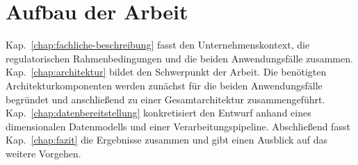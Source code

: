 \section{Aufbau der Arbeit}
\label{sec:aufbau}

Kap.~\ref{chap:fachliche-beschreibung} fasst den Unternehmenskontext, die
regulatorischen Rahmenbedingungen und die beiden Anwendungsfälle zusammen.
Kap.~\ref{chap:architektur} bildet den
Schwerpunkt der Arbeit. Die benötigten Architekturkomponenten werden zunächst
für die beiden Anwendungsfälle begründet und anschließend zu einer
Gesamtarchitektur zusammengeführt. Kap.~\ref{chap:datenbereitstellung}
konkretisiert den Entwurf anhand eines dimensionalen Datenmodells und einer
Verarbeitungspipeline. Abschließend fasst Kap.~\ref{chap:fazit} die
Ergebnisse zusammen und gibt einen Ausblick auf das weitere Vorgehen.
